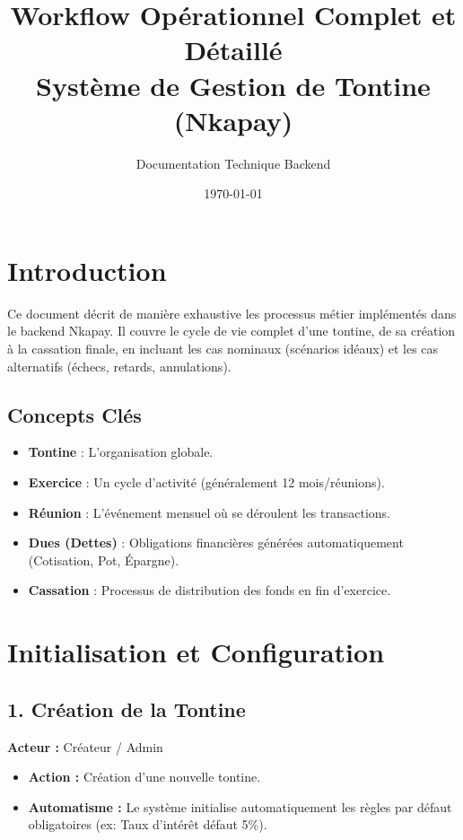 \documentclass[12pt,a4paper]{report}
\title{\textbf{Workflow Opérationnel Complet et Détaillé}\\Système de Gestion de Tontine (Nkapay)}
\author{Documentation Technique Backend}
\date{\today}
\begin{document}
\maketitle
\tableofcontents
\newpage

\chapter{Introduction}
Ce document décrit de manière exhaustive les processus métier implémentés dans le backend Nkapay. Il couvre le cycle de vie complet d'une tontine, de sa création à la cassation finale, en incluant les cas nominaux (scénarios idéaux) et les cas alternatifs (échecs, retards, annulations).

\section{Concepts Clés}
\begin{itemize}
    \item \textbf{Tontine} : L'organisation globale.
    \item \textbf{Exercice} : Un cycle d'activité (généralement 12 mois/réunions).
    \item \textbf{Réunion} : L'événement mensuel où se déroulent les transactions.
    \item \textbf{Dues (Dettes)} : Obligations financières générées automatiquement (Cotisation, Pot, Épargne).
    \item \textbf{Cassation} : Processus de distribution des fonds en fin d'exercice.
\end{itemize}

\chapter{Initialisation et Configuration}

\section{1. Création de la Tontine}
\textbf{Acteur :} Créateur / Admin
\begin{itemize}
    \item \textbf{Action :} Création d'une nouvelle tontine.
    \item \textbf{Automatisme :} Le système initialise automatiquement les règles par défaut obligatoires (ex: Taux d'intérêt défaut 5\%).
\end{itemize}
\end{document}
